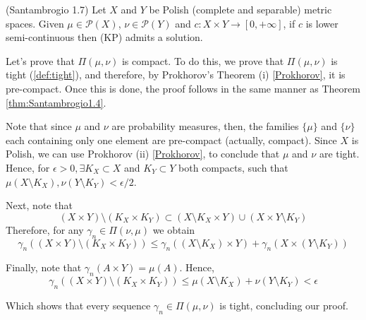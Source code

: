 \begin{theorem}(Santambrogio 1.7)
  Let $X$ and $Y$ be Polish (complete and separable) metric spaces.
  Given $\mu\in \mathcal{P}(X)$, $\nu \in \mathcal P(Y)$ and
  $c:X\times Y \to[0,+\infty]$, if $c$ is lower semi-continuous then
  (KP) admits a solution.
  \label{thm:existanceKPpolish}
\end{theorem}
\begin{prf}

  Let's prove that $\Pi(\mu,\nu)$ is compact. To do this,
  we prove that $\Pi(\mu,\nu)$
  is tight (\ref{def:tight}), and therefore, by Prokhorov's Theorem (i) \ref{Prokhorov},
  it is pre-compact. Once this is done,
  the proof follows in the same manner as Theorem
  \ref{thm:Santambrogio1.4}.

  Note that since $\mu$ and $\nu$ are probability measures, then,
  the families $\{\mu\}$ and $\{\nu\}$ each containing only one element
  are pre-compact (actually, compact). Since $X$ is Polish, we can use Prokhorov (ii)
  \ref{Prokhorov}, to conclude that $\mu$ and $\nu$ are tight.
  Hence,
  for $\epsilon > 0, \exists K_X \subset X$ and $K_Y \subset Y$
  both compacts, such that
  $\mu(X\setminus K_X), \nu(Y\setminus K_Y)<\epsilon /2$.

  Next, note that
  \begin{equation*}
    (X \times Y) \setminus (K_X \times K_Y) \subset
    (X \setminus K_X \times Y)\cup
    (X \times Y \setminus K_Y)
  \end{equation*}
  Therefore, for any $\gamma_n \in \Pi(\nu,\mu)$ we obtain
  \begin{equation*}
    \gamma_n((X \times Y) \setminus (K_X \times K_Y)) \leq
    \gamma_n((X \setminus K_X) \times Y) +
    \gamma_n(X \times (Y \setminus K_Y))
  \end{equation*}

  Finally, note that $\gamma_n(A \times Y) = \mu(A)$. Hence,
  \begin{equation*}
    \gamma_n((X \times Y) \setminus (K_X \times K_Y)) \leq
    \mu(X \setminus K_X) +
    \nu(Y \setminus K_Y) < \epsilon
  \end{equation*}

  Which shows that every sequence $\gamma_n \in \Pi(\mu,\nu)$ is
  tight, concluding our proof.


\end{prf}
